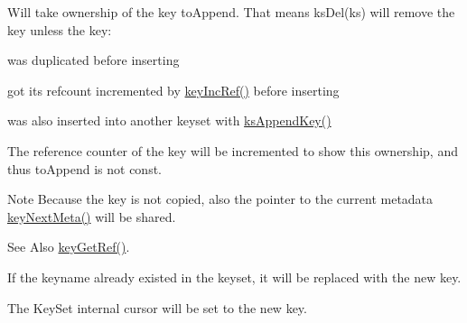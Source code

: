 Will take ownership of the key {\ttfamily to\-Append}. That means ks\-Del(ks) will remove the key unless the key\-:
\begin{DoxyItemize}
\item was duplicated before inserting
\item got its refcount incremented by \hyperlink{group__key_ga6970a6f254d67af7e39f8e469bb162f1}{key\-Inc\-Ref()} before inserting
\item was also inserted into another keyset with \hyperlink{group__keyset_gaa5a1d467a4d71041edce68ea7748ce45}{ks\-Append\-Key()}
\end{DoxyItemize}

The reference counter of the key will be incremented to show this ownership, and thus {\ttfamily to\-Append} is not const.

\begin{DoxyNote}{Note}
Because the key is not copied, also the pointer to the current metadata \hyperlink{group__keymeta_ga4c88342f580a4291455a801af71ce048}{key\-Next\-Meta()} will be shared. 
\end{DoxyNote}


\begin{DoxySeeAlso}{See Also}
\hyperlink{group__key_ga4aabc4272506dd63161db2bbb42de8ae}{key\-Get\-Ref()}.
\end{DoxySeeAlso}
If the keyname already existed in the keyset, it will be replaced with the new key.

The Key\-Set internal cursor will be set to the new key.

